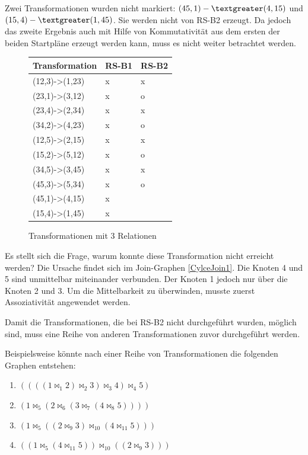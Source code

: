 Zwei Transformationen wurden nicht markiert: $(45,1)-\textgreater(4,15)$ und $(15,4)-\textgreater(1,45)$. Sie werden nicht von RS-B2 erzeugt. Da jedoch das zweite Ergebnis auch mit Hilfe von Kommutativität aus dem ersten der beiden Startpläne erzeugt werden kann, muss es nicht weiter betrachtet werden.


\begin{figure}[ht]
\centering
\begin{tabular}{|l|l|l|}
\hline
{\bf Transformation}   & {\bf RS-B1} & {\bf RS-B2} \\ \hline
(12,3)-\textgreater(1,23) & x           & x           \\ \hline
(23,1)-\textgreater(3,12) & x           & o           \\ \hline
(23,4)-\textgreater(2,34) & x           & x           \\ \hline
(34,2)-\textgreater(4,23) & x           & o           \\ \hline
(12,5)-\textgreater(2,15) & x           & x           \\ \hline
(15,2)-\textgreater(5,12) & x           & o           \\ \hline
(34,5)-\textgreater(3,45) & x           & x           \\ \hline
(45,3)-\textgreater(5,34) & x           & o           \\ \hline
(45,1)-\textgreater(4,15) & x           &             \\ \hline
(15,4)-\textgreater(1,45) & x           &             \\ \hline
\end{tabular}


\caption{Transformationen mit 3 Relationen}
\label{Transformations3Rel}
\end{figure}

Es stellt sich die Frage, warum konnte diese Transformation nicht erreicht werden? Die Ursache findet sich im Join-Graphen \ref{CylceJoin1}. Die Knoten 4 und 5 sind unmittelbar miteinander verbunden. Der Knoten 1 jedoch nur über die Knoten 2 und 3. Um die Mittelbarkeit zu überwinden, musste zuerst Assoziativität angewendet werden.

Damit die Transformationen, die bei RS-B2 nicht durchgeführt wurden, möglich sind, muss eine Reihe von anderen Transformationen zuvor durchgeführt werden. 

Beispielsweise könnte nach einer Reihe von Transformationen die folgenden Graphen entstehen:

\begin{enumerate}
\item $((((1 \Join_{1} 2) \Join_{2} 3) \Join_{3} 4) \Join_{4} 5)$
\item $(1 \Join_{5} (2 \Join_{6} (3 \Join_{7} (4 \Join_{8} 5))))$
\item $(1 \Join_{5} ((2 \Join_{9} 3) \Join_{10} (4 \Join_{11} 5)))$
\item $((1 \Join_{5} (4 \Join_{11} 5)) \Join_{10} ((2 \Join_{9} 3)  ))$
\end{enumerate}

